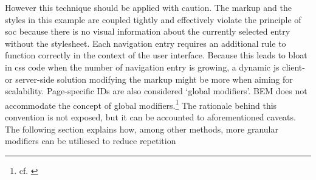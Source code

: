 However this technique should be applied with caution.
The markup and the styles in this example are coupled tightly and effectively violate the principle of \gls{soc} because there is no visual information about the currently selected entry without the stylesheet.
Each navigation entry requires an additional rule to function correctly in the context of the user interface.
Because this leads to bloat in \gls{css} code when the number of navigation entry is growing, a dynamic \gls{js} client- or server-side solution modifying the markup might be more when aiming for scalability.
Page-specific IDs are also considered `global modifiers'.
BEM does not accommodate the concept of global modifiers.\footnote{cf. \cite{bemfaq}}
The rationale behind this convention is not exposed, but it can be accounted to aforementioned caveats.
The following section explains how, among other methods, more granular modifiers can be utiliesed to reduce repetition
